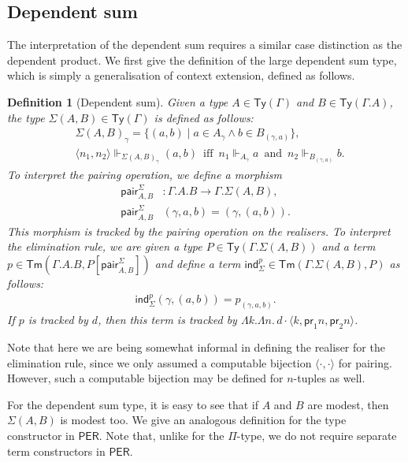 \documentclass[10pt,a4paper]{article}
\newtheorem{definition}[theorem]{Definition}
\theoremstyle{definition}
\theoremstyle{remark}
\renewcommand{\.}{.\,} %
\renewcommand{\:}{:} %
\newcommand{\pair}{\mathsf{pair} }
\newcommand{\ind}{\mathsf{ind}}
\newcommand{\0}{\mathbf{0}}
\newcommand{\1}{\mathbf{1}}
\newcommand\<\langle
\renewcommand\>\rangle
\newcommand{\Per}{\mathsf{PER}}
\newcommand{\pr}{\mathsf{pr}}
\newcommand{\Ty}{\mathsf{Ty}}
\newcommand{\Tm}{\mathsf{Tm}}
\newcommand{\Iff}{\hspace{6pt}\text{iff}\hspace{6pt}}
\renewcommand{\and}{\hspace{6pt}\text{and}\hspace{6pt}}
\theoremstyle{remark}
\begin{document}
\subsection{Dependent sum}
The interpretation of the dependent sum requires a similar case distinction as the dependent product. We first give the definition of the large dependent sum type, which is simply a generalisation of context extension, defined as follows.
\begin{definition}[Dependent sum]
	Given a type $A \in \Ty(\Gamma)$ and $B \in \Ty(\Gamma.A)$, the type $\Sigma(A, B) \in \Ty(\Gamma)$ is defined as follows:
	\begin{align*}
		& \Sigma(A, B)_\gamma  = \{ (a, b) \mid a \in A_\gamma \land b \in B_{(\gamma, a)}\}, \\
		& \langle n_1, n_2 \rangle \Vdash_{\Sigma(A, B)_\gamma} (a, b) \Iff n_1\Vdash_{A_\gamma} a \and n_2 \Vdash_{B_{(\gamma, a)}} b.
	\end{align*}
	To interpret the pairing operation, we define a morphism \begin{align*}
		\pair^\Sigma_{A, B}&: \Gamma.A.B \to \Gamma.\Sigma(A, B), \\
		\pair^\Sigma_{A, B}&(\gamma, a, b) = (\gamma, (a, b)).
	\end{align*}
	This morphism is tracked by the pairing operation on the realisers.
	To interpret the elimination rule, we are given a type $P \in \Ty(\Gamma.\Sigma(A, B))$ and a term $p \in \Tm(\Gamma.A.B, P[\pair^\Sigma_{A, B}])$ and define a term $\ind_\Sigma^{p} \in \Tm(\Gamma.\Sigma(A, B), P)$ as follows:
	\begin{align*}
		\ind_\Sigma^{ p}(\gamma, (a, b)) = p_{(\gamma, a, b)}.
	\end{align*}
	If $p$ is tracked by $d$, then this term is tracked by $\Lambda k . \Lambda n \. d \cdot \langle k, \pr_1 n, \pr_2 n \rangle$.
\end{definition}
Note that here we are being somewhat informal in defining the realiser for the elimination rule, since we only assumed a computable bijection $\langle \cdot , \cdot \rangle$ for pairing. However, such a computable bijection may be defined for $n$-tuples as well. 

For the dependent sum type, it is easy to see that if $A$ and $B$ are modest, then $\Sigma(A, B)$ is modest too. We give an analogous definition for the type constructor in $\Per$. Note that, unlike for the $\Pi$-type, we do not require separate term constructors in $\Per$.
\end{document}
